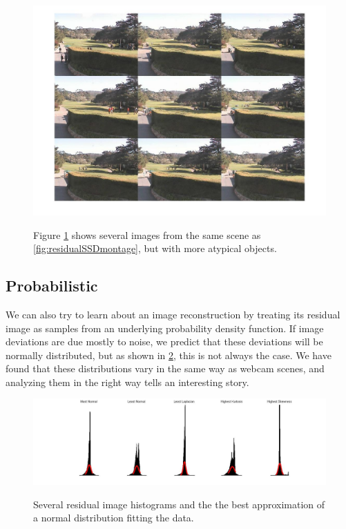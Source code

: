 \begin{figure}
	\centering
		\includegraphics[width=1\textwidth]{figures/residualZScoreMontage.jpg}
	\label{fig:residualZScoreMontage}
	
		\caption[Z-Score Montage.]{Figure \ref{fig:residualZScoreMontage} shows several images from the same scene as \ref{fig:residualSSDmontage}, but with more atypical objects.}
\end{figure}





\subsection{Probabilistic}

We can also try to learn about an image reconstruction by treating its residual image as samples from an 
underlying probability density function.  If image deviations are due mostly to noise, we predict that these deviations will be normally distributed, but as shown in \ref{fig:severalHists}, this is not always the case.  We have found that these distributions vary in the same way as webcam scenes, and analyzing them in the right way tells an interesting story.


\begin{figure}
	\centering
		\includegraphics[width=1\textwidth]{figures/severalHists2.jpg}
	\label{fig:severalHists}
	
		\caption[Several residual image histograms.]{Several residual image histograms and the the best approximation of a normal distribution fitting the data.}
\end{figure}



